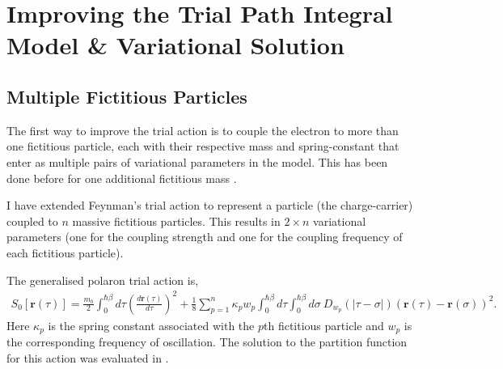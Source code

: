 \chapter{Improving the Trial Path Integral Model \& Variational Solution}
\label{chap:fourth}



\section{Multiple Fictitious Particles}
\label{sec:chap-fourth-first}

The first way to improve the trial action is to couple the electron to more than one fictitious particle, each with their respective mass and spring-constant that enter as multiple pairs of variational parameters in the model. This has been done before for one additional fictitious mass \cite{Abe1971}. 
\newline

I have extended Feynman's trial action to represent a particle (the charge-carrier) coupled to $n$ massive fictitious particles. This results in $2 \times n$ variational parameters (one for the coupling strength and one for the coupling frequency of each fictitious particle).
\newline

The generalised polaron trial action is,
\begin{equation} \label{eqn:multi_trial_action}
    \begin{gathered}
        S_{0}[\mathbf{r}(\tau)] =
        \frac{m_b}{2}\int^{\hbar \beta}_0 d\tau \left(\frac{d\mathbf{r}(\tau)}{d\tau}\right)^2 +
        \frac{1}{8} \sum_{p = 1}^n \kappa_{p} w_{p} \int^{\hbar\beta}_0 d\tau \int^{\hbar\beta}_0 d\sigma\ D_{w_p}(|\tau - \sigma|) (\mathbf{r}(\tau) - \mathbf{r}(\sigma))^{2} .
    \end{gathered}
\end{equation}
Here $\kappa_{p}$ is the spring constant associated with the $p$th fictitious particle and $w_{p}$ is the corresponding frequency of oscillation. The solution to the partition function for this action was evaluated in \cite{Poulter1992}.
\newline

